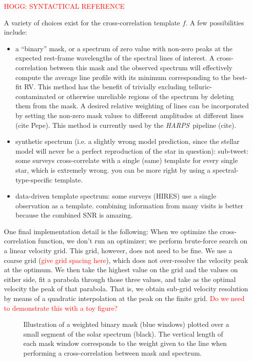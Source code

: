 \documentclass[modern]{aastex62}
\newcommand{\todo}[1]{\textcolor{red}{#1}}  %
\newcommand{\acronym}[1]{{\small{#1}}}
\newcommand{\project}[1]{\textsl{#1}}
\newcommand{\HARPS}{\project{\acronym{HARPS}}}
\begin{document}
\todo{HOGG: SYNTACTICAL REFERENCE}

A variety of choices exist for the cross-correlation template $f$. A few possibilities include:
\begin{itemize}
\item a ``binary'' mask, or a spectrum of zero value with non-zero peaks at the expected rest-frame wavelengths of the spectral lines of interest. A cross-correlation between this mask and the observed spectrum will effectively compute the average line profile with its minimum corresponding to the best-fit RV. This method has the benefit of trivially excluding telluric-contaminated or otherwise unreliable regions of the spectrum by deleting them from the mask. A desired relative weighting of lines can be incorporated by setting the non-zero mask values to different amplitudes at different lines (cite Pepe). This method is currently used by the \HARPS\ pipeline (cite).
\item synthetic spectrum (i.e. a slightly wrong model prediction, since the stellar model will never be a perfect reproduction of the star in question): sub-tweet: some surveys cross-correlate with a single (same) template for every single star, which is extremely wrong. you can be more right by using a spectral-type-specific template.
\item data-driven template spectrum: some surveys (HIRES) use a single observation as a template. combining information from many visits is better because the combined SNR is amazing.
\end{itemize}

One final implementation detail is the following:
When we optimize the cross-correlation function, we don't run an optimizer;
we perform brute-force search on a linear velocity grid.
This grid, however, does not need to be fine.
We use a coarse grid (\todo{give grid spacing here}), which does not
over-resolve the velocity peak at the optimum.
We then take the highest value on the grid and the values on either
side, fit a parabola through those three values, and take as the optimal
velocity the peak of that parabola.
That is, we obtain sub-grid velocity resolution by means of a quadratic
interpolation at the peak on the finite grid.
\todo{Do we need to demonstrate this with a toy figure?}

\begin{figure}
\centering
\caption{Illustration of a weighted binary mask (blue windows) plotted over a small segment of the solar spectrum (black). The vertical length of each mask window corresponds to the weight given to the line when performing a cross-correlation between mask and spectrum.}
\label{fig:binarymask}
\end{figure}
\end{document}
